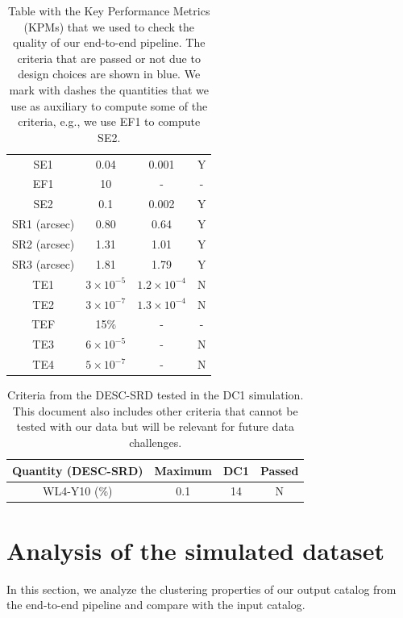 \documentclass[twocolumn]{aastex62}
\newcommand{\rachel}[1]{{\textcolor{cyan}{{\textbf (RM: #1)}}}}
\begin{document}
\begin{table}[h!]
\begin{tabular}{|c|c|c|c|}
SE1 & 0.04 & 0.001 & Y\\
EF1 & 10 & - & -\\
SE2 & 0.1 & 0.002 & Y\\
SR1 (arcsec) & 0.80 & 0.64 & Y\\
SR2 (arcsec) & 1.31 & 1.01 & Y\\
SR3 (arcsec) & 1.81 & 1.79 & Y\\
TE1 & $3 \times 10^{-5}$ & $1.2\times 10^{-4}$ & N\\
TE2 & $3 \times 10^{-7}$ & $1.3\times 10^{-4}$ & N\\
TEF & 15\% & - & -\\
TE3 & $6 \times 10^{-5}$ & - & N\\
TE4 & $5 \times 10^{-7}$ & - & N\\
\hline
\end{tabular}
\caption{Table with the Key Performance Metrics (KPMs) that we used to check the quality of our end-to-end pipeline. The criteria that are passed or not due to design choices are shown in blue. We mark with dashes the quantities that we use as auxiliary to compute some of the criteria, e.g., we use EF1 to compute SE2.}
\label{tab:kpm_table}
\end{table}

\begin{table}[h!]
\begin{tabular}{|c|c|c|c|}
\hline
Quantity (DESC-SRD) & Maximum & DC1 & Passed \\
\hline
WL4-Y10 (\%) & 0.1 & 14 & N\\
\hline
\end{tabular}
\caption{Criteria from the DESC-SRD tested in the DC1 simulation. This document also includes other criteria that cannot be tested with our data but will be relevant for future data challenges.}
\label{tab:desc_srd_table}
\end{table}


\section{Analysis of the simulated dataset}
\label{sec:analysis}
In this section, we analyze the clustering properties of our output catalog from the end-to-end pipeline and compare with the input catalog.
\end{document}
